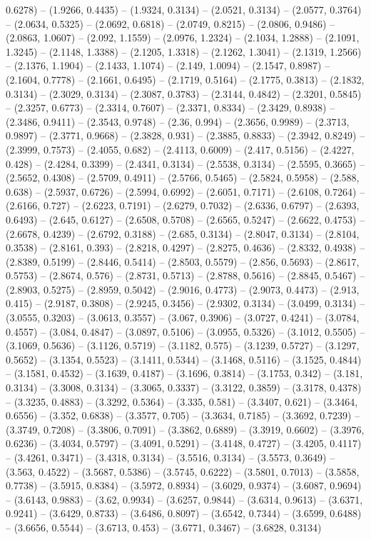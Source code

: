 0.6278) -- (1.9266, 0.4435) -- (1.9324, 0.3134) -- (2.0521, 0.3134) -- (2.0577, 0.3764) -- (2.0634, 0.5325) -- (2.0692, 0.6818) -- (2.0749, 0.8215) -- (2.0806, 0.9486) -- (2.0863, 1.0607) -- (2.092, 1.1559) -- (2.0976, 1.2324) -- (2.1034, 1.2888) -- (2.1091, 1.3245) -- (2.1148, 1.3388) -- (2.1205, 1.3318) -- (2.1262, 1.3041) -- (2.1319, 1.2566) -- (2.1376, 1.1904) -- (2.1433, 1.1074) -- (2.149, 1.0094) -- (2.1547, 0.8987) -- (2.1604, 0.7778) -- (2.1661, 0.6495) -- (2.1719, 0.5164) -- (2.1775, 0.3813) -- (2.1832, 0.3134) -- (2.3029, 0.3134) -- (2.3087, 0.3783) -- (2.3144, 0.4842) -- (2.3201, 0.5845) -- (2.3257, 0.6773) -- (2.3314, 0.7607) -- (2.3371, 0.8334) -- (2.3429, 0.8938) -- (2.3486, 0.9411) -- (2.3543, 0.9748) -- (2.36, 0.994) -- (2.3656, 0.9989) -- (2.3713, 0.9897) -- (2.3771, 0.9668) -- (2.3828, 0.931) -- (2.3885, 0.8833) -- (2.3942, 0.8249) -- (2.3999, 0.7573) -- (2.4055, 0.682) -- (2.4113, 0.6009) -- (2.417, 0.5156) -- (2.4227, 0.428) -- (2.4284, 0.3399) -- (2.4341, 0.3134) -- (2.5538, 0.3134) -- (2.5595, 0.3665) -- (2.5652, 0.4308) -- (2.5709, 0.4911) -- (2.5766, 0.5465) -- (2.5824, 0.5958) -- (2.588, 0.638) -- (2.5937, 0.6726) -- (2.5994, 0.6992) -- (2.6051, 0.7171) -- (2.6108, 0.7264) -- (2.6166, 0.727) -- (2.6223, 0.7191) -- (2.6279, 0.7032) -- (2.6336, 0.6797) -- (2.6393, 0.6493) -- (2.645, 0.6127) -- (2.6508, 0.5708) -- (2.6565, 0.5247) -- (2.6622, 0.4753) -- (2.6678, 0.4239) -- (2.6792, 0.3188) -- (2.685, 0.3134) -- (2.8047, 0.3134) -- (2.8104, 0.3538) -- (2.8161, 0.393) -- (2.8218, 0.4297) -- (2.8275, 0.4636) -- (2.8332, 0.4938) -- (2.8389, 0.5199) -- (2.8446, 0.5414) -- (2.8503, 0.5579) -- (2.856, 0.5693) -- (2.8617, 0.5753) -- (2.8674, 0.576) -- (2.8731, 0.5713) -- (2.8788, 0.5616) -- (2.8845, 0.5467) -- (2.8903, 0.5275) -- (2.8959, 0.5042) -- (2.9016, 0.4773) -- (2.9073, 0.4473) -- (2.913, 0.415) -- (2.9187, 0.3808) -- (2.9245, 0.3456) -- (2.9302, 0.3134) -- (3.0499, 0.3134) -- (3.0555, 0.3203) -- (3.0613, 0.3557) -- (3.067, 0.3906) -- (3.0727, 0.4241) -- (3.0784, 0.4557) -- (3.084, 0.4847) -- (3.0897, 0.5106) -- (3.0955, 0.5326) -- (3.1012, 0.5505) -- (3.1069, 0.5636) -- (3.1126, 0.5719) -- (3.1182, 0.575) -- (3.1239, 0.5727) -- (3.1297, 0.5652) -- (3.1354, 0.5523) -- (3.1411, 0.5344) -- (3.1468, 0.5116) -- (3.1525, 0.4844) -- (3.1581, 0.4532) -- (3.1639, 0.4187) -- (3.1696, 0.3814) -- (3.1753, 0.342) -- (3.181, 0.3134) -- (3.3008, 0.3134) -- (3.3065, 0.3337) -- (3.3122, 0.3859) -- (3.3178, 0.4378) -- (3.3235, 0.4883) -- (3.3292, 0.5364) -- (3.335, 0.581) -- (3.3407, 0.621) -- (3.3464, 0.6556) -- (3.352, 0.6838) -- (3.3577, 0.705) -- (3.3634, 0.7185) -- (3.3692, 0.7239) -- (3.3749, 0.7208) -- (3.3806, 0.7091) -- (3.3862, 0.6889) -- (3.3919, 0.6602) -- (3.3976, 0.6236) -- (3.4034, 0.5797) -- (3.4091, 0.5291) -- (3.4148, 0.4727) -- (3.4205, 0.4117) -- (3.4261, 0.3471) -- (3.4318, 0.3134) -- (3.5516, 0.3134) -- (3.5573, 0.3649) -- (3.563, 0.4522) -- (3.5687, 0.5386) -- (3.5745, 0.6222) -- (3.5801, 0.7013) -- (3.5858, 0.7738) -- (3.5915, 0.8384) -- (3.5972, 0.8934) -- (3.6029, 0.9374) -- (3.6087, 0.9694) -- (3.6143, 0.9883) -- (3.62, 0.9934) -- (3.6257, 0.9844) -- (3.6314, 0.9613) -- (3.6371, 0.9241) -- (3.6429, 0.8733) -- (3.6486, 0.8097) -- (3.6542, 0.7344) -- (3.6599, 0.6488) -- (3.6656, 0.5544) -- (3.6713, 0.453) -- (3.6771, 0.3467) -- (3.6828, 0.3134) 